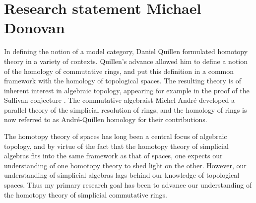 \documentclass[11pt]{article}
\theoremstyle{plain}
\begin{document}






\section*{\huge Research statement \hfill\normalsize Michael Donovan} 


In defining the notion of a model category, Daniel Quillen \cite{QuillenHomAlg.pdf} formulated homotopy theory in a variety of contexts. Quillen's advance allowed him to define a notion of the homology of commutative rings, and put this definition in a common framework with the homology of topological spaces. The resulting theory is of inherent interest in algebraic topology, appearing for example in the proof of the Sullivan conjecture \cite{MillerSullivanConjecture.pdf}. The commutative algebraist Michel Andr\'e developed a parallel theory of the simplicial resolution of rings, and the homology of rings is now referred to as Andr\'e-Quillen homology for their contributions. 
%
%
%
%
%
%
%
%
%

The homotopy theory of spaces has long been a central focus of algebraic topology, and by virtue of the fact that the homotopy theory of simplicial algebras fits into the same framework as that of spaces, one expects our understanding of one homotopy theory to shed light on the other. However, our understanding of simplicial algebras lags behind our knowledge of topological spaces. Thus my primary research goal has been to advance our understanding of the homotopy theory of simplicial commutative rings. 
\end{document}

